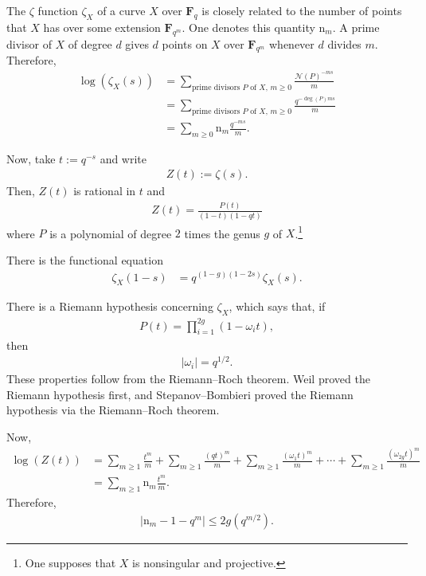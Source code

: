 \documentclass [11 pt, oneside] {article}
\begin{document}
The $\zeta$ function $\zeta_X$ of a curve $X$ over $\mathbf{F}_{q}$ is closely related to the number of points that $X$ has over some extension $\mathbf{F}_{q^m}$. One denotes this quantity $\mathup{n}_m$.
A prime divisor of $X$ of degree $d$ gives $d$ points on $X$ over $\mathbf{F}_{q^m}$ whenever $d$ divides $m$.
Therefore,
\begin{align*}
	\log(\zeta_X(s)) &= \sum_{\textrm{prime divisors $P$ of $X$, $m\ge 0$}}^{} \frac{\mathscr{N}(P) ^{-ms}}{m}\\
			 &= \sum_{\textrm{prime divisors $P$ of $X$, $m\ge 0$}}^{} \frac{q^{-\deg(P) ms}}{m}\\
			 &= \sum_{m\ge 0}^{} \mathup{n}_m \frac{q^{-ms}}{m}.
\end{align*}	

Now, take $t:= q^{-s}$ and write
\begin{align*}
	Z(t) := \zeta (s).
\end{align*}
Then, $Z(t)$ is rational in $t$ and
\begin{align*}
	Z(t) =  \frac{P(t)}{(1-t) (1-qt)}
\end{align*}
where $P$ is a polynomial of degree $2$ times the genus $g$ of $X$.\footnote{One supposes that $X$ is nonsingular and projective.}

There is the functional equation
\begin{align*}
	\zeta_X(1-s)&= q^{(1-g) (1-2s)}\zeta_X (s).
\end{align*}

There is a Riemann hypothesis concerning $\zeta_X$, which says that, if 
\begin{align*}
	P(t) = \prod_{i=1}^{2g}  (1-\omega_it),
\end{align*}
then
\begin{align*}
	\left\lvert \omega_i \right\rvert = q^{1/2}.
\end{align*}
These properties follow from the Riemann--Roch theorem. Weil proved the Riemann hypothesis first, and Stepanov--Bombieri proved the Riemann hypothesis via the Riemann--Roch theorem.

Now,
\begin{align*}
	\log(Z(t)) &=
	   \sum_{m\ge 1}^{} \frac{t^m}{m} + \sum_{m\ge 1}^{}  \frac{(qt) ^m}{m} + \sum_{m\ge 1}^{} \frac{(\omega_1t)^m}{m} + \cdots + \sum_{m\ge 1}^{} \frac{(\omega_{2g}t)^m}{m}\\
		   &= \sum_{m\ge 1}^{} \mathup{n}_m\frac{t^m}{m}.
\end{align*}
Therefore,
\begin{align*}
	\left\lvert \mathup{n}_m -1 - q^m \right\rvert \le 2g(q^{m/2}).
\end{align*}
\end{document}
